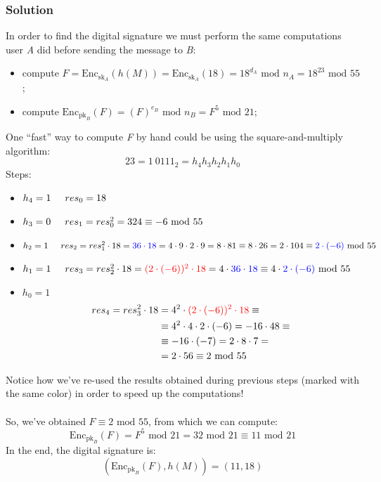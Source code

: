 \documentclass[11pt, a4paper]{article}
\newcommand{\doublequotes}[1]{“#1”}
\newcommand{\mymod}{
    \text{ mod }
}
\begin{document}
\subsubsection*{Solution}
In order to find the digital signature we must perform the same computations user \textit{A} did before sending the message to \textit{B}:
\begin{itemize}
    \item compute $F = \text{Enc}_{\text{sk}_A}(h(M))=\text{Enc}_{\text{sk}_A}(18)=18^{d_A}\mymod n_A=18^{23}\mymod55$;
    \item compute $\text{Enc}_{\text{pk}_B}(F)=(F)^{e_B}\mymod n_B=F^5\mymod21$;
\end{itemize}
One \doublequotes{fast} way to compute \textit{F} by hand could be using the square-and-multiply algorithm:
$$23=1\ 0111_2=h_4h_3h_2h_1h_0$$
Steps:
\begin{itemize}
    \item $h_4=1\hspace{0.5cm}res_0=18$
    \item $h_3=0\hspace{0.5cm}res_1=res_0^2=324\equiv-6\mymod55$
    \item $h_2=1\hspace{0.5cm}res_2=res_1^2\cdot18=\textcolor{blue}{36\cdot18}=4\cdot9\cdot2\cdot9=8\cdot81\equiv8\cdot26=2\cdot104\equiv\textcolor{blue}{2\cdot(-6)}\mymod55$
    \item $h_1=1\hspace{0.5cm}res_3=res_2^2\cdot18=\textcolor{red}{(2\cdot(-6))^2\cdot18}=4\cdot\textcolor{blue}{36\cdot18}\equiv4\cdot\textcolor{blue}{2\cdot(-6)}\mymod55$
    \item $h_0=1$
    \begin{align*}
        res_4=res_3^2\cdot18&=4^2\cdot\textcolor{red}{(2\cdot(-6))^2\cdot18}\equiv\\
        &\equiv4^2\cdot4\cdot2\cdot(-6)=-16\cdot48\equiv\\
        &\equiv-16\cdot(-7)=2\cdot8\cdot7=\\
        &=2\cdot56\equiv2\mymod55
    \end{align*}
\end{itemize}
Notice how we've re-used the results obtained during previous steps (marked with the same color) in order to speed up the computations!\\\\
So, we've obtained $F\equiv2\mymod55$, from which we can compute:
$$\text{Enc}_{\text{pk}_B}(F)=F^5\mymod21=32\mymod21\equiv11\mymod21$$
In the end, the digital signature is:
$$(\text{Enc}_{\text{pk}_B}(F),h(M))=(11,18)$$
\end{document}
